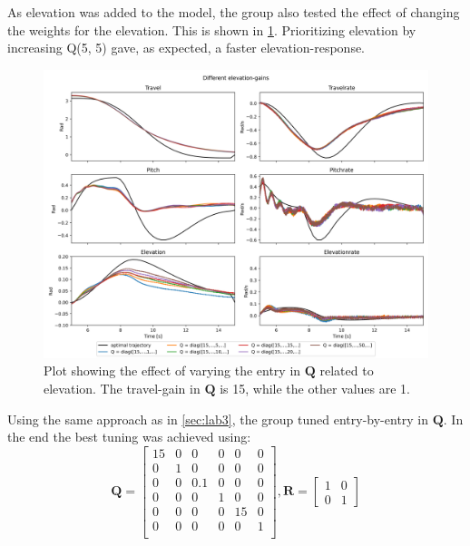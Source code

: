\documentclass[../main.tex]{subfiles}
\begin{document}
As elevation was added to the model, the group also tested the effect of changing the weights for the elevation. This is shown in \cref{fig:lab4_diff_elevation_values}. Prioritizing elevation by increasing Q(5, 5) gave, as expected, a faster elevation-response. 
\begin{figure}[h]
	\centering
	\includegraphics[width=\linewidth]{figures/LAB4_elevation_gains.png}
	\caption{Plot showing the effect of varying the entry in $ \bm Q $ related to elevation. The travel-gain in $ \bm Q $ is 15, while the other values are 1.}
	\label{fig:lab4_diff_elevation_values}
\end{figure}


Using the same approach as in \cref{sec:lab3}, the group tuned entry-by-entry in $ \bm Q $. In the end the best tuning was achieved using: 
\begin{equation}\label{key}
	\bm Q = \begin{bmatrix}
		15 & 0 & 0 & 0 & 0 & 0	\\
		0 & 1 & 0 & 0 & 0 	& 0\\
		0 & 0 & 0.1 & 0 & 0& 0 \\
		0 & 0 & 0 & 1 & 0 & 0	\\
		0 & 0 & 0 & 0 & 15 	& 0\\
		0 & 0 & 0 & 0 & 0 	& 1\\
	\end{bmatrix}, 
	\bm R = \begin{bmatrix}
		1 & 0 \\ 
		0 & 1
	\end{bmatrix}
\end{equation}
\end{document}
